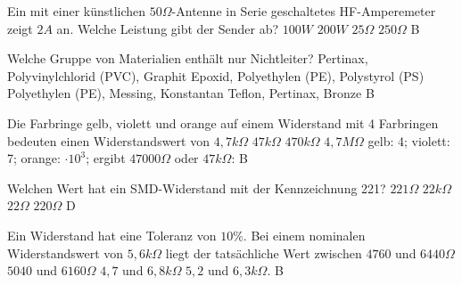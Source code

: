 {Ein mit einer künstlichen $50\Omega$-Antenne in Serie geschaltetes HF-Amperemeter zeigt $2A$ an. Welche Leistung gibt der Sender ab?}%
{$100W$}%
{$200W$}%
{$25\Omega$}%
{$250\Omega$}%
{B}%

{Welche Gruppe von Materialien enthält nur Nichtleiter?}%
{Pertinax, Polyvinylchlorid (PVC), Graphit}%
{Epoxid, Polyethylen (PE), Polystyrol (PS)}%
{Polyethylen (PE), Messing, Konstantan}%
{Teflon, Pertinax, Bronze}%
{B}%


{Die Farbringe gelb, violett und orange auf einem Widerstand mit 4 Farbringen bedeuten einen Widerstandswert von}%
{$4,7k\Omega$}%
{$47k\Omega$}%
{$470k\Omega$}%
{$4,7M\Omega$}%
{gelb: 4; violett: 7; orange: $\cdot 10^3$; ergibt $47000\Omega$ oder $47k\Omega$: B}%

{Welchen Wert hat ein SMD-Widerstand mit der Kennzeichnung 221?}%
{$221\Omega$}%
{$22k\Omega$}%
{$22\Omega$}%
{$220\Omega$}%
{D}%

{Ein Widerstand hat eine Toleranz von $10 \%$. Bei einem nominalen Widerstandswert von $5,6 k\Omega$ liegt der tatsächliche Wert zwischen}%
{$4760$ und $6440 \Omega$}%
{$5040$ und $6160 \Omega$}%
{$4,7$ und $6,8 k\Omega$}%
{$5,2$ und $6,3 k\Omega.$}%
{B}%

